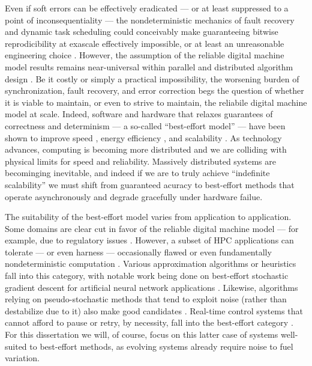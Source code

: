 Even if soft errors can be effectively eradicated --- or at least suppressed to a point of inconsequentiality --- the nondeterministic mechanics of fault recovery and dynamic task scheduling could conceivably make guaranteeing bitwise reprodicibility at exascale effectively impossible, or at least an unreasonable engineering choice \citep{dongarra2014applied}.
However, the assumption of the reliable digital machine model results remains near-universal within parallel and distributed algorithm design \citep{chakradhar2010best}.
Be it costly or simply a practical impossibility, the worsening burden of synchronization, fault recovery, and error correction begs the question of whether it is viable to maintain, or even to strive to maintain, the reliabile digital machine model at scale.
Indeed, software and hardware that relaxes guarantees of correctness and determinism --- a so-called ``best-effort model'' --- have been shown to improve speed \citep{chakrapani2008probabilistic}, energy efficiency \citep{chakrapani2008probabilistic,bocquet2018memory}, and scalability \citep{meng2009best}.
As technology advances, computing is becoming more distributed and we are colliding with physical limits for speed and reliability.
Massively distributed systems are becominging inevitable, and indeed if we are to truly achieve ``indefinite scalability'' \citep{ackley2011pursue} we must shift from guaranteed acuracy to best-effort methods that operate asynchronously and degrade gracefully under hardware failue.

The suitability of the best-effort model varies from application to application.
Some domains are clear cut in favor of the reliable digital machine model --- for example, due to regulatory issues \citep{dengorra2014applied}.
However, a subset of HPC applications can tolerate --- or even harness --- occasionally flawed or even fundamentally nondeterministic computation \citep{chakradhar2010best}.
Various approximation algorithms or heuristics fall into this category, with notable work being done on best-effort stochastic gradient descent for artificial neural network applications \citep{dean2012large,zhao2019elastic,niu2011hogwild,noel2014dogwild}.
Likewise, algorithms relying on pseudo-stochastic methods that tend to exploit noise (rather than destabilize due to it) also make good candidates \citep{chakrapani2008probabilistic,chakradhar2010best}.
Real-time control systems that cannot afford to pause or retry, by necessity, fall into the best-effort category \citep{rahmati2011computing}.
For this dissertation we will, of course, focus on this latter case of systems well-suited to best-effort methods, as evolving systems already require noise to fuel variation.

